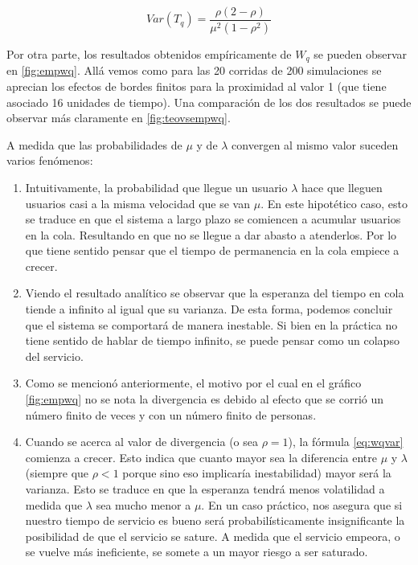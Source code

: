 \documentclass{sig-alternate}
\begin{document}
\begin{equation}
\label{eq:wqvar}
  Var(T_q) = \frac{\rho(2-\rho)}{\mu^2(1-\rho^2)}
\end{equation}

Por otra parte, los resultados obtenidos emp\'iricamente de $W_q$ se pueden observar en \ref{fig:empwq}.
All\'a vemos como para las 20 corridas de 200 simulaciones se aprecian los efectos de bordes finitos para
la proximidad al valor 1 (que tiene asociado 16 unidades de tiempo).
Una comparaci\'on de los dos resultados se puede observar m\'as claramente en \ref{fig:teovsempwq}.

A medida que las probabilidades de $\mu$ y de $\lambda$ convergen al mismo valor suceden varios fen\'omenos: 
\begin{enumerate}
\item Intuitivamente, la probabilidad que llegue un usuario $\lambda$ hace que lleguen usuarios casi a la misma velocidad que se van $\mu$. En este hipotético caso, esto se traduce en que el sistema a largo plazo se comiencen a acumular usuarios en la cola. Resultando en que no se llegue a dar abasto a atenderlos. Por lo que tiene sentido pensar que el tiempo de permanencia en la cola empiece a crecer.
\item Viendo el resultado anal\'itico se observar que la esperanza del tiempo en cola tiende a infinito al igual que su varianza. De esta forma, podemos concluir que el sistema se comportará de manera inestable. Si bien en la práctica no tiene sentido de hablar de tiempo infinito, se puede pensar como un colapso del servicio.
\item Como se mencion\'o anteriormente, el motivo por el cual en el gr\'afico \ref{fig:empwq} no se nota la divergencia es debido al efecto que se corrió un número finito de veces y con un número finito de personas. 
\item Cuando se acerca al valor de divergencia (o sea $\rho=1$), la f\'ormula \ref{eq:wqvar}  comienza a crecer.
Esto indica que cuanto mayor sea la diferencia entre $\mu$ y $\lambda$ (siempre que $\rho < 1$ porque sino eso
implicar\'ia inestabilidad) mayor ser\'a la varianza.
Esto se traduce en que la esperanza tendr\'a menos volatilidad a medida que $\lambda$ sea mucho menor a $\mu$.
En un caso pr\'actico, nos asegura que si nuestro tiempo de servicio es bueno ser\'a probabil\'isticamente
insignificante la posibilidad de que el servicio se sature.
A medida que el servicio empeora, o se vuelve m\'as ineficiente, se somete a un mayor riesgo a ser saturado.


\end{enumerate}
\end{document}
